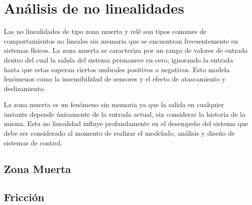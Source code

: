 \section{Análisis de no linealidades}

Las no linealidades de tipo zona muerta y relé son tipos comunes de comportamientos no lineales sin memoria que se encuentran frecuentemente en sistemas físicos. La zona muerta se caracteriza por un rango de valores de entrada dentro del cual la salida del sistema permanece en cero, ignorando la entrada hasta que estas superan ciertos umbrales positivos o negativos. Esto modela fenómenos como la insensibilidad de sensores y el efecto de atascamiento y deslizamiento.

La zona muerta es un fenómeno sin memoria ya que la salida en cualquier instante depende únicamente de la entrada actual, sin considerar la historia de la misma. Esta no linealidad influye profundamente en el desempeño del sistema que debe ser considerado al momento de realizar el modelado, análisis y diseño de sistemas de control.

\subsection{Zona Muerta}


\subsection{Fricción}